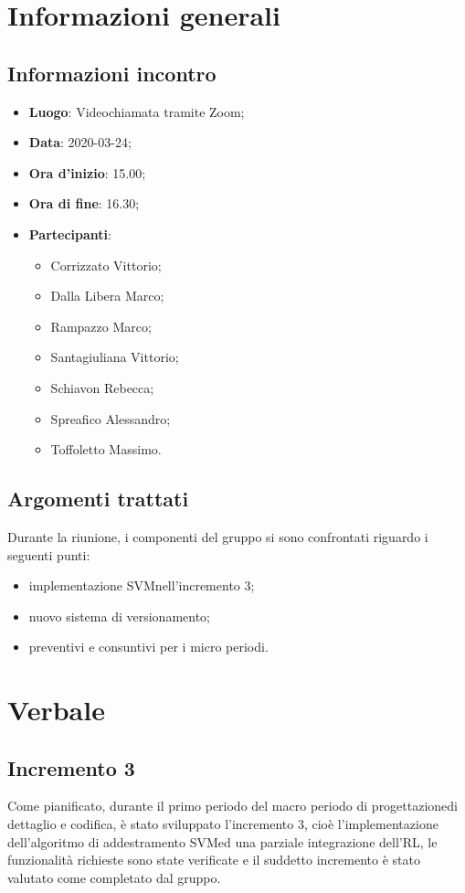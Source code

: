 \section{Informazioni generali}
    \subsection{Informazioni incontro}
        \begin{itemize}
            \item \textbf{Luogo}: Videochiamata tramite Zoom;
            \item \textbf{Data}: 2020-03-24;
            \item \textbf{Ora d'inizio}: 15.00;
            \item \textbf{Ora di fine}: 16.30;
            \item \textbf{Partecipanti}: \begin{itemize}
                \item Corrizzato Vittorio;
                \item Dalla Libera Marco;
                \item Rampazzo Marco;
                \item Santagiuliana Vittorio;
                \item Schiavon Rebecca;
                \item Spreafico Alessandro;
                \item Toffoletto Massimo.
            \end{itemize}
        \end{itemize}
    \subsection{Argomenti trattati}
        Durante la riunione, i componenti del gruppo si sono confrontati riguardo i seguenti punti:
		\begin{itemize}
			\item implementazione SVM\glosp nell'incremento 3;
			\item nuovo sistema di versionamento\glo;
			\item preventivi e consuntivi per i micro periodi.
		\end{itemize}
\section{Verbale}
    \subsection{Incremento 3}
    Come pianificato, durante il primo periodo del macro periodo di progettazione\glosp di dettaglio e codifica, è stato sviluppato l'incremento 3, cioè l'implementazione dell'algoritmo di addestramento SVM\glo ed una parziale integrazione dell'RL\glo, le funzionalità richieste sono state verificate e il suddetto incremento è stato valutato come completato dal gruppo.
    
